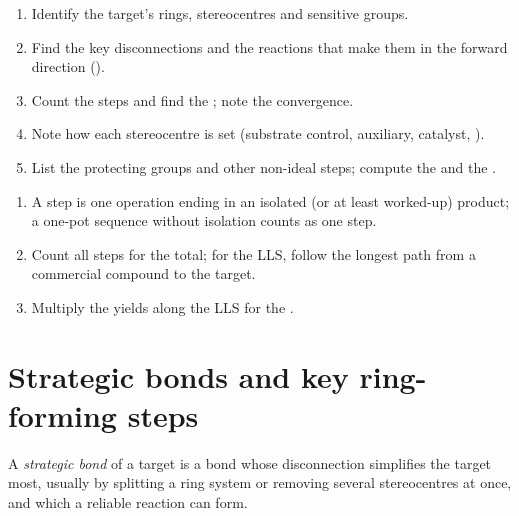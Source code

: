 \begin{method}\label{met:b3:total-synthesis:analyse}
\begin{enumerate}
  \item Identify the target's rings, stereocentres and sensitive groups.
  \item Find the key disconnections and the reactions that make them in the forward
        direction ().
  \item Count the steps and find the ; note the convergence.
  \item Note how each stereocentre is set (substrate control, auxiliary, catalyst,
        ).
  \item List the protecting groups and other non-ideal steps; compute the  and the .
\end{enumerate}
\end{method}

\begin{method}\label{met:b3:total-synthesis:count}
\begin{enumerate}
  \item A step is one operation ending in an isolated (or at least worked-up)
        product; a one-pot sequence without isolation counts as one step.
  \item Count all steps for the total; for the LLS, follow the longest path from a
        commercial compound to the target.
  \item Multiply the yields along the LLS for the .
\end{enumerate}
\end{method}

\section{Strategic bonds and key ring-forming steps}

\begin{definition}\label{def:b3:total-synthesis:strategic-bond}
A \emph{strategic bond} of a target is a bond whose
disconnection simplifies the target most, usually by splitting a ring system
or removing several stereocentres at once, and which a reliable reaction can
form.
\end{definition}

